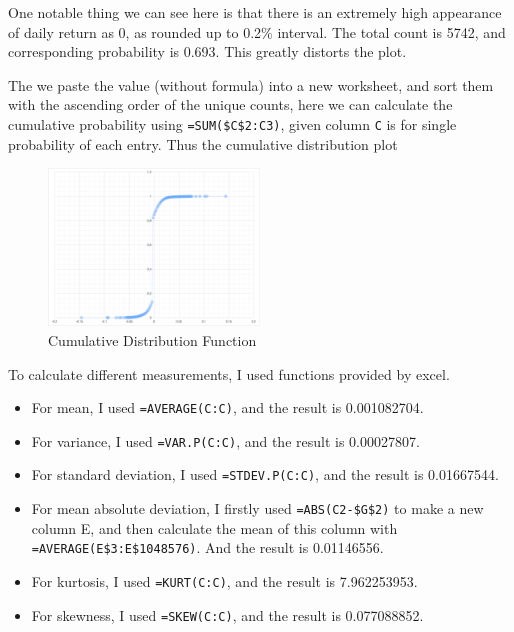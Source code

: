 \documentclass[margin=1in]{article}
\begin{document}
	   One notable thing we can see here is that there is an extremely high appearance of daily return as 0, as rounded up to 0.2\% interval. The total count is 5742, and corresponding probability is 0.693. This greatly distorts the plot.
	   
	   The we paste the value (without formula) into a new worksheet, and sort them with the ascending order of the unique counts, here we can calculate the cumulative probability using \texttt{=SUM(\$C\$2:C3)}, given column \texttt{C} is for single probability of each entry. Thus the cumulative distribution plot
	   
	   \pagebreak
	     \begin{figure}[h]
	     	\caption{Cumulative Distribution Function}
	     	\centering
	     	\includegraphics[width=0.5\textwidth]{HW1_Q7_2}
	     \end{figure}
		   
		   To calculate different measurements, I used functions provided by excel.
		   
		   \begin{itemize}
		   	\item For mean, I used \texttt{=AVERAGE(C:C)}, and the result is 0.001082704.
		   	\item For variance, I used \texttt{=VAR.P(C:C)}, and the result is 0.00027807.
		   	\item For standard deviation, I used \texttt{=STDEV.P(C:C)}, and the result is 0.01667544.
		   	\item For mean absolute deviation, I firstly used \texttt{=ABS(C2-\$G\$2)} to make a new column E, and then calculate the mean of this column with \texttt{=AVERAGE(E\$3:E\$1048576)}. And the result is 0.01146556.
		   	\item For kurtosis, I used \texttt{=KURT(C:C)}, and the result is 7.962253953.
		   	\item For skewness, I used \texttt{=SKEW(C:C)}, and the result is 0.077088852.
   			  \end{itemize}
	   
\end{document}
